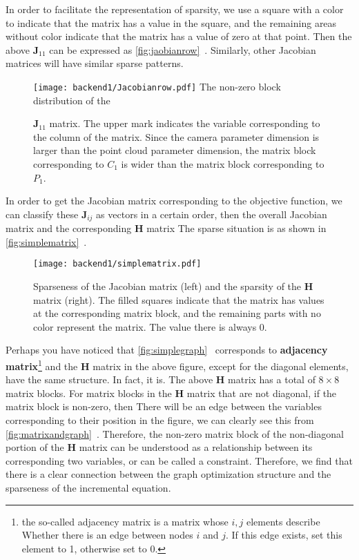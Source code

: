 In order to facilitate the representation of sparsity, we use a square with a color to indicate that the matrix has a value in the square, and the remaining areas without color indicate that the matrix has a value of zero at that point. Then the above $\bm{J}_{11}$ can be expressed as \autoref{fig:jaobianrow}~. Similarly, other Jacobian matrices will have similar sparse patterns.

\begin{figure}[!t]
\centering
\texttt{[image: backend1/Jacobianrow.pdf]}
The non-zero block distribution of the \caption{$\bm{J}_{11}$ matrix. The upper mark indicates the variable corresponding to the column of the matrix. Since the camera parameter dimension is larger than the point cloud parameter dimension, the matrix block corresponding to $C_1$ is wider than the matrix block corresponding to $P_1$. }
\label{fig:jaobianrow}
\end{figure}

In order to get the Jacobian matrix corresponding to the objective function, we can classify these $\bm{J}_{ij}$ as vectors in a certain order, then the overall Jacobian matrix and the corresponding $\bm{H}$ matrix The sparse situation is as shown in \autoref{fig:simplematrix}~.

\begin{figure}[!t]
\centering
\texttt{[image: backend1/simplematrix.pdf]}
\caption{Sparseness of the Jacobian matrix (left) and the sparsity of the $\bm{H}$ matrix (right). The filled squares indicate that the matrix has values ​​at the corresponding matrix block, and the remaining parts with no color represent the matrix. The value there is always 0. }
\label{fig:simplematrix}
\end{figure}

Perhaps you have noticed that \autoref{fig:simplegraph}~ corresponds to \textbf{adjacency matrix}\footnote{the so-called adjacency matrix is ​​a matrix whose $i, j$ elements describe Whether there is an edge between nodes $i$ and $j$. If this edge exists, set this element to 1, otherwise set to 0. } and the $\bm{H}$ matrix in the above figure, except for the diagonal elements, have the same structure. In fact, it is. The above $\bm{H}$ matrix has a total of $8\times 8$ matrix blocks. For matrix blocks in the $\bm{H}$ matrix that are not diagonal, if the matrix block is non-zero, then There will be an edge between the variables corresponding to their position in the figure, we can clearly see this from \autoref{fig:matrixandgraph}~. Therefore, the non-zero matrix block of the non-diagonal portion of the $\bm{H}$ matrix can be understood as a relationship between its corresponding two variables, or can be called a constraint. Therefore, we find that there is a clear connection between the graph optimization structure and the sparseness of the incremental equation.

